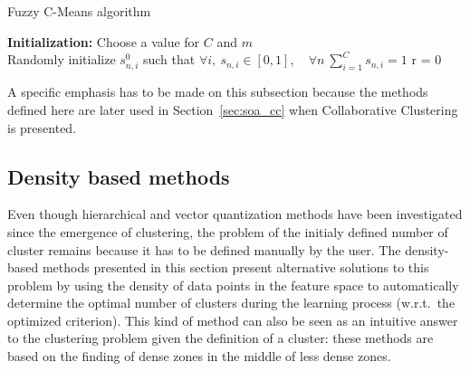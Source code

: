     \begin{algorithm}
        \caption{Fuzzy C-Means algorithm}
\label{alg:fcm}
    \textbf{Initialization:} Choose a value for $C$ and $m$\\
    Randomly initialize $s^0_{n,i}$ such that $\forall i, ~ s_{n,i} \in [0,1], \quad \forall n ~ \sum\limits_{i=1}^C s_{n,i} = 1$
    r = 0
\end{algorithm}

A specific emphasis has to be made on this subsection because the methods defined here are later used in Section~\ref{sec:soa_cc} when Collaborative Clustering is presented.

\subsection{Density based methods}

Even though hierarchical and vector quantization methods have been investigated since the emergence of clustering, the problem of the initialy defined number of cluster remains because it has to be defined manually by the user. The density-based methods presented in this section present alternative solutions to this problem by using the density of data points in the feature space to automatically determine the optimal number of clusters during the learning process (w.r.t.\ the optimized criterion). This kind of method can also be seen as an intuitive answer to the clustering problem given the definition of a cluster: these methods are based on the finding of dense zones in the middle of less dense zones.

